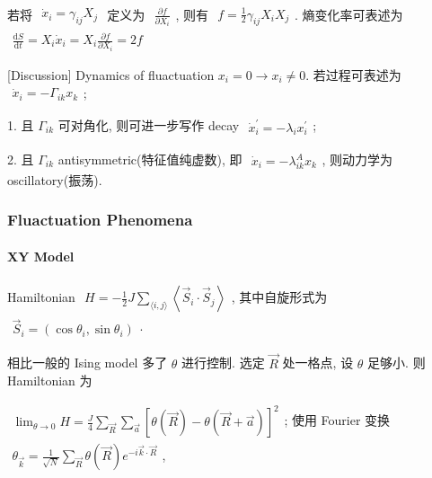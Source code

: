 \documentclass[../../main.tex]{subfiles}
\begin{document}
若将 $\begin{aligned}
    \dot{x}_{i} = \gamma_{ij}X_{j}
\end{aligned}$ 定义为 $\begin{aligned}
    \frac{\partial f}{\partial X_{i}}
\end{aligned}$, 则有 $\begin{aligned}
    f = \frac{1}{2}\gamma_{ij}X_{i}X_{j}
\end{aligned}$. 熵变化率可表述为 $\begin{aligned}
    \frac{\mathrm{d}S}{\mathrm{d}t} = X_{i}\dot{x}_{i} = X_{i}\frac{\partial f}{\partial X_{i}} = 2f
\end{aligned}$

[Discussion] Dynamics of fluactuation $x_{i}=0\rightarrow x_{i}\neq 0$. 若过程可表述为 $\begin{aligned}
    \dot{x}_{i} = -\Gamma_{ik}x_{k}
\end{aligned}$;

1. 且 $\Gamma_{ik}$ 可对角化, 则可进一步写作 decay $\begin{aligned}
    \dot{x}_{i}^{\prime} = -\lambda_{i}x_{i}^{\prime}
\end{aligned}$; 

2. 且 $\Gamma_{ik}$ antisymmetric(特征值纯虚数), 即 $\begin{aligned}
    \dot{x}_{i} = -\lambda_{ik}^{A}x_{k}
\end{aligned}$, 则动力学为 oscillatory(振荡).

\subsubsection{Fluactuation Phenomena}

\paragraph{XY Model}
Hamiltonian $\begin{aligned}
    H = -\frac{1}{2}J\sum_{\langle i,j\rangle}\left\langle \vec{S}_{i}\cdot\vec{S}_{j}\right\rangle
\end{aligned}$, 其中自旋形式为 $\begin{aligned}
    \vec{S}_{i} = \left(\cos\theta_{i},\sin\theta_{i}\right)
\end{aligned}$. 

相比一般的 Ising model 多了 $\theta$ 进行控制. 选定 $\vec{R}$ 处一格点, 设 $\theta$ 足够小. 则 Hamiltonian 为 

$\begin{aligned}
    \lim_{\theta\rightarrow 0}H = \frac{J}{4}\sum_{\vec{R}}\sum_{\vec{a}}\left[
        \theta\left(\vec{R}\right) - \theta\left(\vec{R}+\vec{a}\right)
    \right]^{2}
\end{aligned}$; 使用 Fourier 变换 $\begin{aligned}
    \theta_{\vec{k}} = \frac{1}{\sqrt{N}}\sum_{\vec{R}}\theta\left(\vec{R}\right)e^{-i\vec{k}\cdot\vec{R}}
\end{aligned}$, 
\end{document}
